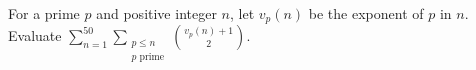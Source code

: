 For a prime $p$ and positive integer $n$, let $v_p(n)$ be the exponent of $p$ in $n$. Evaluate $\sum_{n=1}^{50}\sum_{\substack{p\le n\\p\text{ prime}}}\binom{v_p(n)+1}{2}$.
